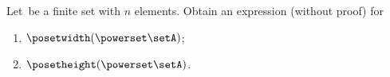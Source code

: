 \vfill
\begin{gradedexercise}
    \label{ex:MeasurePowerPoset}

    Let~\setA be a finite set with $n$ elements.
    Obtain an expression (without proof) for
    \begin{enumerate}
        \item $\posetwidth(\powerset  \setA)$;
        \item $\posetheight(\powerset \setA)$.
    \end{enumerate}
\end{gradedexercise}

